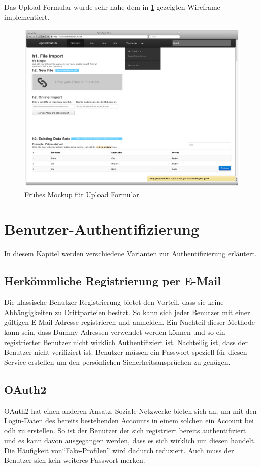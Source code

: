 Das Upload-Formular wurde sehr nahe dem in \cref{fig:pd:wireframe-upload} gezeigten Wireframe implementiert.

\begin{figure}[H]
    \centering
    \includegraphics[width=0.8\linewidth]{fig/Wireframes-Upload}
    \caption{Frühes Mockup für Upload Formular}
    \label{fig:pd:wireframe-upload}
\end{figure}

\section{Benutzer-Authentifizierung}

In diesem Kapitel werden verschiedene Varianten zur Authentifizierung erläutert.

\subsection{Herkömmliche Registrierung per E-Mail}
Die klassische Benutzer-Registrierung bietet den Vorteil, dass sie keine Abhängigkeiten zu Drittparteien besitzt. So kann sich jeder Benutzer mit einer gültigen E-Mail Adresse registrieren und anmelden. Ein Nachteil dieser Methode kann sein, dass Dummy-Adressen verwendet werden können und so ein registrierter Benutzer nicht wirklich Authentifiziert ist. Nachteilig ist, dass der Benutzer nicht verifiziert ist. Benutzer müssen ein Passwort speziell für diesen Service erstellen um den persönlichen Sicherheitsansprüchen zu genügen.

\subsection{OAuth2}

OAuth2 hat einen anderen Ansatz. Soziale Netzwerke bieten sich an, um mit den Login-Daten des bereits bestehenden Accounts in einem solchen ein Account bei \acl{odh} zu erstellen. So ist der Benutzer der sich registriert bereits authentifiziert und es kann davon ausgegangen werden, dass es sich wirklich um diesen handelt. Die Häufigkeit von``Fake-Profilen'' wird dadurch reduziert. Auch muss der Benutzer sich kein weiteres Passwort merken.

